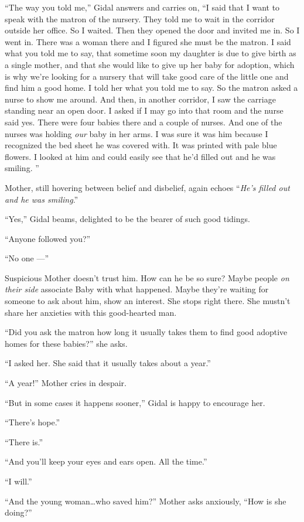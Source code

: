 \documentclass[twoside,11pt,openany]{book}
\begin{document}
``The way you told me,'' Gidal answers and carries on, ``I said that I want to
speak with the matron of the nursery. They told me to wait in the corridor outside her office. So I waited. Then they
opened the door and invited me in. So I went in. There was a woman there and I figured she must be the matron. I said
what you told me to say, that sometime soon my daughter is due to give birth as a single mother, and that she would
like to give up her baby for adoption, which is why we're looking for a nursery that will take good care of the little
one and find him a good home. I told her what you told me to say. So the matron asked a nurse to show me around.  And
then, in another corridor, I saw the carriage standing near an open door. I asked if I may go into that room and the
nurse said yes. There were four babies there and a couple of nurses. And one of the nurses was holding\textit{ our
}baby in her arms. I was sure it was him because I recognized the bed sheet he was covered with. It was printed with
pale blue flowers. I looked at him and could easily see that he'd filled out and he was smiling. ''

Mother, still hovering between belief and disbelief, again{ }echoes
``\textit{He's filled out and he was smiling}.''

``Yes,'' Gidal beams, delighted to be the bearer of such good tidings.

``Anyone followed you?''

``No one ---''

Suspicious Mother doesn't trust him. How can he be so sure? Maybe people
\textit{on their side} associate Baby with what happened. Maybe they're waiting for someone to ask about him, show an
interest. She stops right there. She mustn't share her anxieties with this good-hearted man.

``Did you ask the matron how long it usually takes them to find good adoptive homes for these
babies?'' she asks.

``I asked her. She said that it usually takes about a year.''

``A year!'' Mother cries in despair.

``But in some cases it happens sooner,'' Gidal is happy to encourage her.

``There's hope.''

``There is.''

``And you'll keep your eyes and ears open. All the time.''

``I will.''

``And the young woman{\ldots}who saved him?'' Mother asks anxiously, ``How is she
doing?''
\end{document}

